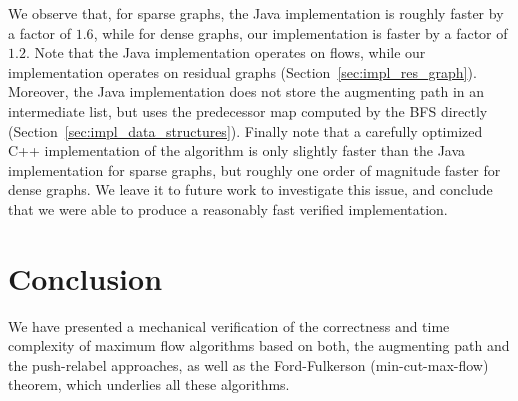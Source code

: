 \documentclass[smallcondensed]{svjour3}     %
\begin{document}
  We observe that, for sparse graphs, the Java implementation is roughly faster by a factor of $1.6$, while for dense graphs, our implementation is faster by a factor of $1.2$. Note that the Java implementation operates on flows, while our implementation 
  operates on residual graphs (\cf Section~\ref{sec:impl_res_graph}). Moreover, the Java implementation does not store the augmenting 
  path in an intermediate list, but uses the predecessor map computed by the BFS directly (\cf Section~\ref{sec:impl_data_structures}).
  Finally note that a carefully optimized C++ implementation of the algorithm is only slightly faster than the Java implementation for sparse graphs,
  but roughly one order of magnitude faster for dense graphs. We leave it to future work to investigate this issue, and conclude that we were able to produce
  a reasonably fast verified implementation.
  
  
% 
% 
    
    

\section{Conclusion}\label{sec:concl}
  We have presented a mechanical verification of the correctness and time complexity of maximum flow algorithms based on both, 
  the augmenting path and the push-relabel approaches, as well as the Ford-Fulkerson (min-cut-max-flow) theorem, which underlies all these algorithms.
  
\end{document}
